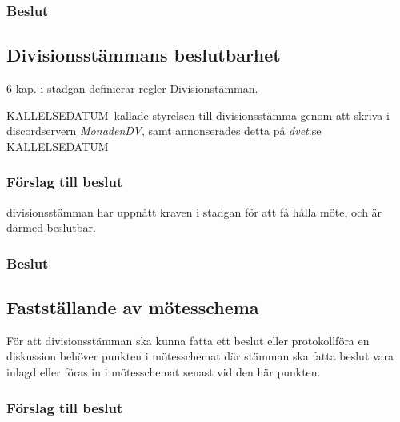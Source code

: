 \documentclass[protokoll]{dvd}
\def\kall{KALLELSEDATUM}
\begin{document}
\subsubsection*{Beslut}
\begin{attsatser}
    \item %
\end{attsatser}


\subsection{Divisionsstämmans beslutbarhet}

6 kap. i stadgan definierar regler Divisionstämman.

\kall \ 
kallade styrelsen till divisionsstämma genom att skriva i discordservern \emph{MonadenDV}, samt annonserades detta på \emph{dvet}.se \kall

\subsubsection*{Förslag till beslut}

\begin{attsatser}
    \item divisionsstämman har uppnått kraven i stadgan för att få hålla möte, och är därmed beslutbar.
\end{attsatser}

\subsubsection*{Beslut}
\begin{attsatser}
    \item %
\end{attsatser}


\subsection{Fastställande av mötesschema}

För att divisionsstämman ska kunna fatta ett beslut eller protokollföra en diskussion behöver punkten i mötesschemat där stämman ska fatta beslut vara inlagd eller föras in i mötesschemat senast vid den här punkten.

\subsubsection*{Förslag till beslut}
\end{document}

